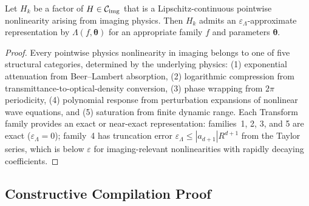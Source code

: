 \documentclass[11pt]{article}
\begin{document}
\begin{lemma}
\label{lem:nonlinear}
Let $H_k$ be a factor of $H \in \mathcal{C}_{\mathrm{img}}$ that is a Lipschitz-continuous pointwise nonlinearity arising from imaging physics. Then $H_k$ admits an $\varepsilon_\Lambda$-approximate representation by $\Lambda(f, \boldsymbol{\theta})$ for an appropriate family $f$ and parameters $\boldsymbol{\theta}$.
\end{lemma}

\begin{proof}
Every pointwise physics nonlinearity in imaging belongs to one of five structural categories, determined by the underlying physics: (1) exponential attenuation from Beer--Lambert absorption, (2) logarithmic compression from transmittance-to-optical-density conversion, (3) phase wrapping from $2\pi$ periodicity, (4) polynomial response from perturbation expansions of nonlinear wave equations, and (5) saturation from finite dynamic range. Each Transform family provides an exact or near-exact representation: families~1, 2, 3, and 5 are exact ($\varepsilon_\Lambda = 0$); family~4 has truncation error $\varepsilon_\Lambda \leq |a_{d+1}| R^{d+1}$ from the Taylor series, which is below $\varepsilon$ for imaging-relevant nonlinearities with rapidly decaying coefficients.
\end{proof}

\subsection{Constructive Compilation Proof}
\end{document}
